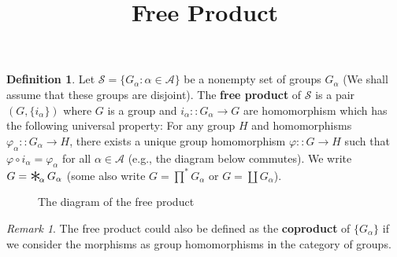 \documentclass[a4paper]{article}
\title{Free Product}
\date{}
\theoremstyle{remark}
\newtheorem*{remark}{Remark}
\theoremstyle{definition}
\theoremstyle{definition}
\newtheorem{definition}{Definition}
\theoremstyle{plain}
\DeclareMathOperator*{\freeprod}{\raisebox{-0.4ex}{\scalebox{2}{$\ast$}}\!}
\begin{document}
  \maketitle
  \vspace*{-2.5cm}
  \begin{definition}
    Let $\mathcal{S} = \{ G_\alpha : \alpha \in \mathcal{A} \}$ be a nonempty set of groups $G_{\alpha}$
    (We shall assume that these groups are disjoint).
    The {\bf free product} of $\mathcal{S}$ is a pair $(G, \{i_\alpha\})$ where $G$ is a group
    and $i_{\alpha} :: G_\alpha \to G$ are homomorphism which has the following universal property:
    For any group $H$ and homomorphisms $\varphi_\alpha :: G_\alpha \to H$, 
    there exists a unique group homomorphism $\varphi :: G \to H$ such that $\varphi \circ i_\alpha = \varphi_\alpha$ for
    all $\alpha \in \mathcal{A}$ (e.g., the diagram below commutes).
    We write $G = \freeprod_\alpha G_\alpha$ (some also write
    $G = \prod^* G_\alpha$ or $G = \coprod G_\alpha$).
  \end{definition}

  \begin{figure}[h]
    \centering
    \caption{The diagram of the free product}
  \end{figure}

  \begin{remark}
    The free product could also be defined as the {\bf coproduct} of $\{ G_\alpha \}$ if we consider the morphisms
    as group homomorphisms in the category of groups.
  \end{remark}
\end{document}

